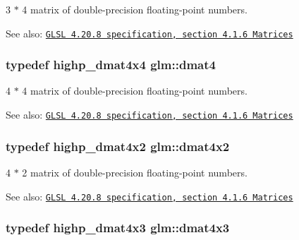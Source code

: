 3 $\ast$ 4 matrix of double-precision floating-point numbers.

\begin{Desc}
\item[See also:]\href{http://www.opengl.org/registry/doc/GLSLangSpec.4.20.8.pdf}{\tt GLSL 4.20.8 specification, section 4.1.6 Matrices} \end{Desc}
\hypertarget{group__core__types_g7f7c1300ebfd19d573e9deb1e8758b54}{
\subsubsection[dmat4]{\setlength{\rightskip}{0pt plus 5cm}typedef highp\_\-dmat4x4 {\bf glm::dmat4}}}
\label{group__core__types_g7f7c1300ebfd19d573e9deb1e8758b54}


4 $\ast$ 4 matrix of double-precision floating-point numbers.

\begin{Desc}
\item[See also:]\href{http://www.opengl.org/registry/doc/GLSLangSpec.4.20.8.pdf}{\tt GLSL 4.20.8 specification, section 4.1.6 Matrices} \end{Desc}
\hypertarget{group__core__types_gb3d51ce41e6f0aa267d3e185cee09c44}{
\subsubsection[dmat4x2]{\setlength{\rightskip}{0pt plus 5cm}typedef highp\_\-dmat4x2 {\bf glm::dmat4x2}}}
\label{group__core__types_gb3d51ce41e6f0aa267d3e185cee09c44}


4 $\ast$ 2 matrix of double-precision floating-point numbers.

\begin{Desc}
\item[See also:]\href{http://www.opengl.org/registry/doc/GLSLangSpec.4.20.8.pdf}{\tt GLSL 4.20.8 specification, section 4.1.6 Matrices} \end{Desc}
\hypertarget{group__core__types_ga4a157ac183c5bd5dcbd555a94b1b505}{
\subsubsection[dmat4x3]{\setlength{\rightskip}{0pt plus 5cm}typedef highp\_\-dmat4x3 {\bf glm::dmat4x3}}}
\label{group__core__types_ga4a157ac183c5bd5dcbd555a94b1b505}


